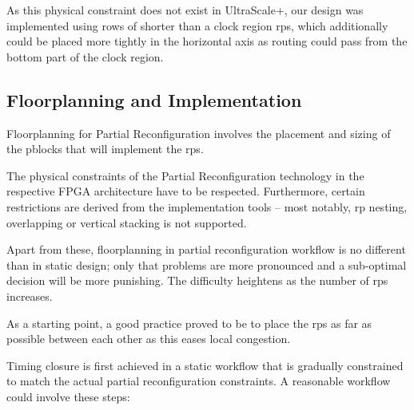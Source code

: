 As this physical constraint does not exist in UltraScale+,
our design was implemented using rows of shorter than a clock region \glspl{rp},
which additionally could be placed more tightly in the horizontal axis
as routing could pass from the bottom part of the clock region.



\subsection{Floorplanning and Implementation}

Floorplanning for Partial Reconfiguration involves the placement and sizing of the \glspl{pblock}
that will implement the \glspl{rp}.

The physical constraints of the Partial Reconfiguration technology
in the respective FPGA architecture have to be respected.
Furthermore, certain restrictions are derived from the implementation tools
-- most notably, \gls{rp} nesting, overlapping or vertical stacking is not supported.

Apart from these, floorplanning in partial reconfiguration workflow is no different
than in static design; only that problems are more pronounced and
a sub-optimal decision will be more punishing. The difficulty heightens as
the number of \glspl{rp} increases.

As a starting point, a good practice proved to be to place the \glspl{rp}
as far as possible between each other as this eases local congestion.

Timing closure is first achieved in a static workflow that is gradually constrained
to match the actual partial reconfiguration constraints.
A reasonable workflow could involve these steps:


